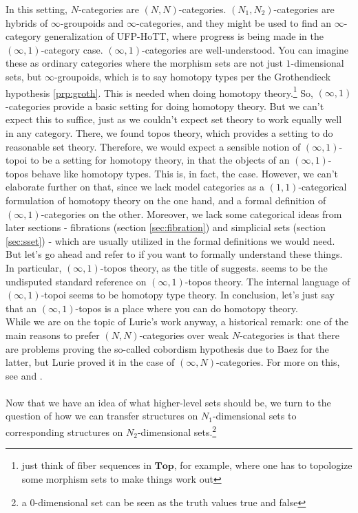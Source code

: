 In this setting, $N$-categories are $(N,N)$-categories.
$(N_{1},N_{2})$-categories are hybrids of $\infty$-groupoids and $\infty$-categories, and they might be used to find an $\infty$-category generalization of UFP-HoTT, where progress is being made in the $(\infty,1)$-category case.
$(\infty,1)$-categories are well-understood.
You can imagine these as ordinary categories where the morphism sets are not just $1$-dimensional sets, but $\infty$-groupoids, which is to say homotopy types per the Grothendieck hypothesis \ref{prp:groth}.
This is needed when doing homotopy theory.\footnote{just think of fiber sequences in $\mathbf{Top}$, for example, where one has to topologize some morphism sets to make things work out} So, $(\infty,1)$-categories provide a basic setting for doing homotopy theory.
But we can't expect this to suffice, just as we couldn't expect set theory to work equally well in any category.
There, we found topos theory, which provides a setting to do reasonable set theory.
Therefore, we would expect a sensible notion of $(\infty,1)$-topoi to be a setting for homotopy theory, in that the objects of an $(\infty,1)$-topos behave like homotopy types.
This is, in fact, the case.
However, we can't elaborate further on that, since we lack model categories as a $(1,1)$-categorical formulation of homotopy theory on the one hand, and a formal definition of $(\infty,1)$-categories on the other.
Moreover, we lack some categorical ideas from later sections - fibrations (section \ref{sec:fibration}) and simplicial sets (section \ref{sec:sset}) - which are usually utilized in the formal definitions we would need.
But let's go ahead and refer to \cite{0349e8ea} if you want to formally understand these things.
In particular, $(\infty,1)$-topos theory, as the title of \cite{0349e8ea} suggests.
\cite{0349e8ea} seems to be the undisputed standard reference on $(\infty,1)$-topos theory.
The internal language of $(\infty,1)$-topoi seems to be homotopy type theory.
In conclusion, let's just say that an $(\infty,1)$-topos is a place where you can do homotopy theory.
\\
While we are on the topic of Lurie's work anyway, a historical remark: one of the main reasons to prefer $(N,N)$-categories over weak $N$-categories is that there are problems proving the so-called cobordism hypothesis due to Baez for the latter, but Lurie proved it in the case of $(\infty,N)$-categories.
For more on this, see \cite{ea5d49bf} and \cite{00000011}.
\\\\
Now that we have an idea of what higher-level sets should be, we turn to the question of how we can transfer structures on $N_{1}$-dimensional sets to corresponding structures on $N_{2}$-dimensional sets.\footnote{a $0$-dimensional set can be seen as the truth values {\glqq}true{\grqq} and {\glqq}false{\grqq}}
